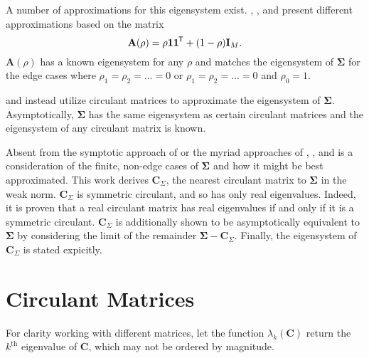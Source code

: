 \documentclass[letterpaper,12pt,oneside,final]{article}
\newcommand{\ve}[1]{\mathbf{#1}}           %
\newcommand{\m}[1]{\mathbf{#1}}               %
\newcommand{\sm}[1]{\boldsymbol{#1}}   %
\newcommand{\tr}[1]{{#1}^{\mkern-1.5mu\mathsf{T}}}              %
\begin{document}
A number of approximations for this eigensystem exist. \cite{cheverud2001}, \cite{LiJi2005}, and \cite{Galwey2009} present different approximations based on the matrix
\begin{equation} \label{eq:multipleTesting:commonCor}
  \m{A}(\rho) = \rho \ve{1} \tr{\ve{1}} + (1 - \rho) \m{I}_M.
\end{equation}
$\m{A}(\rho)$ has a known eigensystem for any $\rho$ and matches the eigensystem of $\sm{\Sigma}$ for the edge cases where $\rho_1 = \rho_2 = \dots = 0$ or $\rho_1 = \rho_2 = \dots = 0$ and $\rho_0 = 1$. 

\cite{gray2006toeplitz} and \cite{grenanderszego1958} instead utilize circulant matrices to approximate the eigensystem of $\sm{\Sigma}$. Asymptotically, $\sm{\Sigma}$ has the same eigensystem as certain circulant matrices and the eigensystem of any circulant matrix is known.

Absent from the symptotic approach of \cite{gray2006toeplitz} or the myriad approaches of \cite{cheverud2001}, \cite{LiJi2005}, and \cite{Galwey2009} is a consideration of the finite, non-edge cases of $\sm{\Sigma}$ and how it might be best approximated. This work derives $\m{C}_{\Sigma}$, the nearest circulant matrix to $\sm{\Sigma}$ in the weak norm. $\m{C}_{\Sigma}$ is symmetric circulant, and so has only real eigenvalues. Indeed, it is proven that a real circulant matrix has real eigenvalues if and only if it is a symmetric circulant. $\m{C}_{\Sigma}$ is additionally shown to be asymptotically equivalent to $\sm{\Sigma}$ by considering the limit of the remainder $\sm{\Sigma} - \m{C}_{\Sigma}$. Finally, the eigensystem of $\m{C}_{\Sigma}$ is stated expicitly.

\section{Circulant Matrices} \label{c:multipleTesting:circDecom}

For clarity working with different matrices, let the function $\lambda_k(\m{C})$ return the $k^{\text{th}}$ eigenvalue of $\m{C}$, which may not be ordered by magnitude.
\end{document}

